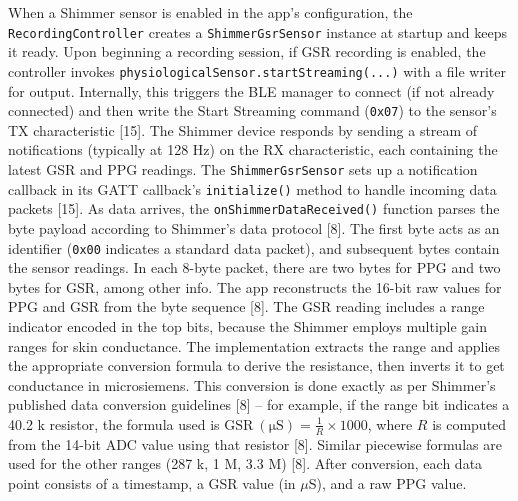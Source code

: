 When a Shimmer sensor is enabled in the app's configuration, the \texttt{RecordingController} creates a \texttt{ShimmerGsrSensor} instance at startup and keeps it ready. Upon beginning a recording session, if GSR recording is enabled, the controller invokes \texttt{physiologicalSensor.startStreaming(...)} with a file writer for output. Internally, this triggers the BLE manager to connect (if not already connected) and then write the Start Streaming command (\texttt{0x07}) to the sensor's TX characteristic [15]. The Shimmer device responds by sending a stream of notifications (typically at 128 Hz) on the RX characteristic, each containing the latest GSR and PPG readings. The \texttt{ShimmerGsrSensor} sets up a notification callback in its GATT callback's \texttt{initialize()} method to handle incoming data packets [15]. As data arrives, the \texttt{onShimmerDataReceived()} function parses the byte payload according to Shimmer's data protocol [8]. The first byte acts as an identifier (\texttt{0x00} indicates a standard data packet), and subsequent bytes contain the sensor readings. In each 8-byte packet, there are two bytes for PPG and two bytes for GSR, among other info. The app reconstructs the 16-bit raw values for PPG and GSR from the byte sequence [8]. The GSR reading includes a range indicator encoded in the top bits, because the Shimmer employs multiple gain ranges for skin conductance. The implementation extracts the range and applies the appropriate conversion formula to derive the resistance, then inverts it to get conductance in microsiemens. This conversion is done exactly as per Shimmer's published data conversion guidelines [8] -- for example, if the range bit indicates a 40.2 k\Omega{} resistor, the formula used is $\mathrm{GSR\ (\mu S)} = \frac{1}{R} \times 1000$, where $R$ is computed from the 14-bit ADC value using that resistor [8]. Similar piecewise formulas are used for the other ranges (287 k\Omega{}, 1 M\Omega{}, 3.3 M\Omega{}) [8]. After conversion, each data point consists of a timestamp, a GSR value (in $\mu$S), and a raw PPG value.

